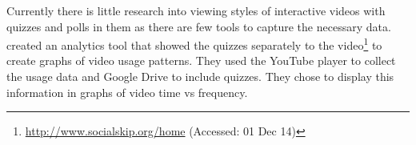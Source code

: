 Currently there is little research into viewing styles of interactive videos with quizzes and polls in them as there are few tools to capture the necessary data.  \citep{videoAnalytics} created an analytics tool that showed the quizzes separately to the video\footnote{\url{http://www.socialskip.org/home} (Accessed: 01 Dec 14)} to create graphs of video usage patterns. They used the YouTube player to collect the usage data and Google Drive to include quizzes. They chose to display this information in graphs of video time vs frequency.
